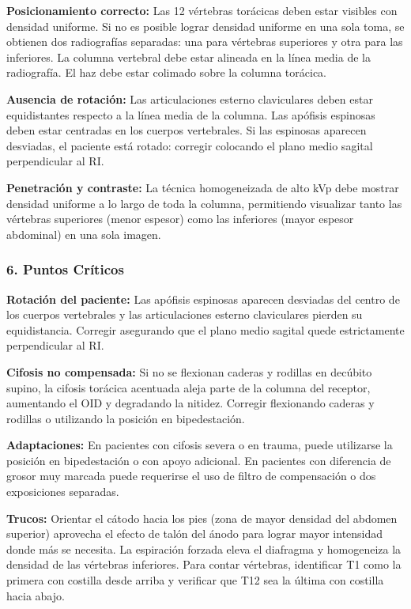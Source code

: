 		\textbf{Posicionamiento correcto:} Las 12 vértebras torácicas deben estar visibles con densidad uniforme. Si no es posible lograr densidad uniforme en una sola toma, se obtienen dos radiografías separadas: una para vértebras superiores y otra para las inferiores. La columna vertebral debe estar alineada en la línea media de la radiografía. El haz debe estar colimado sobre la columna torácica.
		
		\textbf{Ausencia de rotación:} Las articulaciones esterno claviculares deben estar equidistantes respecto a la línea media de la columna. Las apófisis espinosas deben estar centradas en los cuerpos vertebrales. Si las espinosas aparecen desviadas, el paciente está rotado: corregir colocando el plano medio sagital perpendicular al RI.
		
		\textbf{Penetración y contraste:} La técnica homogeneizada de alto kVp debe mostrar densidad uniforme a lo largo de toda la columna, permitiendo visualizar tanto las vértebras superiores (menor espesor) como las inferiores (mayor espesor abdominal) en una sola imagen.
		
		\subsubsection*{6. Puntos Críticos}
		
		\textbf{Rotación del paciente:} Las apófisis espinosas aparecen desviadas del centro de los cuerpos vertebrales y las articulaciones esterno claviculares pierden su equidistancia. Corregir asegurando que el plano medio sagital quede estrictamente perpendicular al RI.
		
		\textbf{Cifosis no compensada:} Si no se flexionan caderas y rodillas en decúbito supino, la cifosis torácica acentuada aleja parte de la columna del receptor, aumentando el OID y degradando la nitidez. Corregir flexionando caderas y rodillas o utilizando la posición en bipedestación.
		
		\textbf{Adaptaciones:} En pacientes con cifosis severa o en trauma, puede utilizarse la posición en bipedestación o con apoyo adicional. En pacientes con diferencia de grosor muy marcada puede requerirse el uso de filtro de compensación o dos exposiciones separadas.
		
		\textbf{Trucos:} Orientar el cátodo hacia los pies (zona de mayor densidad del abdomen superior) aprovecha el efecto de talón del ánodo para lograr mayor intensidad donde más se necesita. La espiración forzada eleva el diafragma y homogeneiza la densidad de las vértebras inferiores. Para contar vértebras, identificar T1 como la primera con costilla desde arriba y verificar que T12 sea la última con costilla hacia abajo.
		
